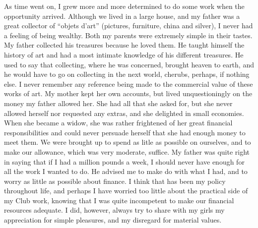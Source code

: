 As time went on, I grew more and more determined to
do some work when the opportunity arrived. Although
we lived in a large house, and my father was a great
collector of “objets d’art” (pictures, furniture, china and
silver), I never had a feeling of being wealthy. Both my
parents were extremely simple in their tastes. My father
collected his treasures because he loved them. He taught
himself the history of art and had a most intimate knowledge
of his different treasures. He used to say that
collecting, where he was concerned, brought heaven to earth,
and he would have to go on collecting in the next world,
cherubs, perhaps, if nothing else. I never remember any
reference being made to the commercial value of these
works of art. My mother kept her own accounts, but lived
unquestioningly on the money my father allowed her. She
had all that she asked for, but she never allowed herself
nor requested any extras, and she delighted in small
economies. When she became a widow, she was rather
frightened of her great financial responsibilities and could
never persuade herself that she had enough money to
meet them. We were brought up to spend as litle as
possible on ourselves, and to make our allowance, which
was very moderate, suffice. My father was quite right
in saying that if I had a million pounds a week, I should
never have enough for all the work I wanted to do. He
advised me to make do with what I had, and to worry
as little as possible about finance. I think that has been
my policy throughout life, and perhaps I have worried
too little about the practical side of my Club work, knowing
that I was quite incompetent to make our financial
resources adequate. I did, however, always try to share
with my girls my appreciation for simple pleasures, and
my disregard for material values.

